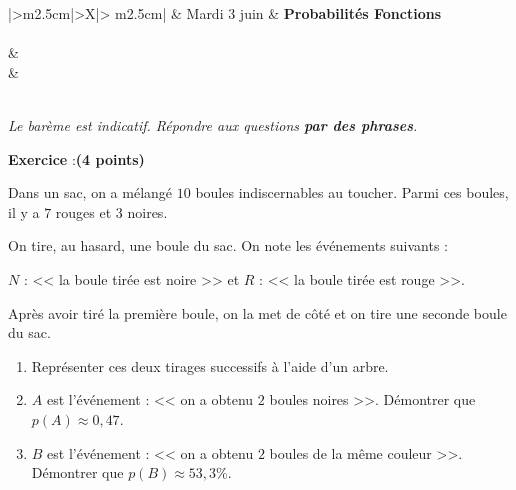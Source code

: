 \documentclass[10pt,french]{book}
\newcounter{exoc}
\newenvironment{exoc}[1]{%
  \refstepcounter{exoc}\textbf{Exercice \theexoc} :\hfill {\textbf{(#1)}}\par
  \medskip}%
{\medskip}
\begin{document}
\begin{center}
\begin{tabularx}{\textwidth}{|>\centering m{2.5cm}|>\centering X|>{\centering\arraybackslash} m{2.5cm}|}
	\hline
		 &  Mardi 3 juin  & \textbf{Probabilités Fonctions} \\
	\hline
		 \\
	\hline
         &  \\
		 &  \\
	\hline
         \\[1cm]
    \hline
\end{tabularx}\medskip

{\itshape
\small
Le barème est indicatif. Répondre aux questions \textbf{par des phrases}.\par
}
\end{center}

\begin{exoc}{4 points}
Dans un sac, on a mélangé $10$ boules indiscernables au toucher. Parmi ces boules, il y a $7$ rouges et $3$ noires.\par
On tire, au hasard, une boule du sac. On note les événements suivants :\par
$N$ : << la boule tirée est noire >> et $R$ : << la boule tirée est rouge >>.\par
Après avoir tiré la première boule, on la met de côté et on tire une seconde boule du sac.

\begin{enumerate}
    \item Représenter ces deux tirages successifs à l'aide d'un arbre.
    \item $A$ est l'événement : << on a obtenu $2$ boules noires >>. Démontrer que $p(A) \approx 0,47$.
    \item $B$ est l'événement : << on a obtenu $2$ boules de la même couleur >>. Démontrer que $p(B) \approx 53,3\%$.
\end{enumerate}
\end{exoc}
\end{document}
